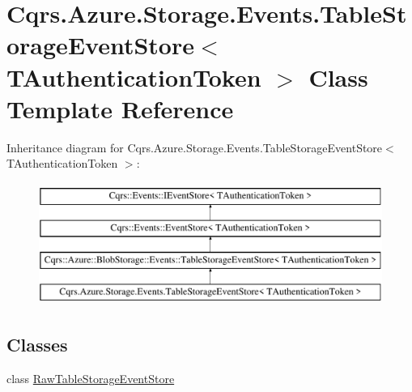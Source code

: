 \hypertarget{classCqrs_1_1Azure_1_1Storage_1_1Events_1_1TableStorageEventStore}{}\section{Cqrs.\+Azure.\+Storage.\+Events.\+Table\+Storage\+Event\+Store$<$ T\+Authentication\+Token $>$ Class Template Reference}
\label{classCqrs_1_1Azure_1_1Storage_1_1Events_1_1TableStorageEventStore}
Inheritance diagram for Cqrs.\+Azure.\+Storage.\+Events.\+Table\+Storage\+Event\+Store$<$ T\+Authentication\+Token $>$\+:\begin{figure}[H]
\begin{center}
\leavevmode
\includegraphics[height=4.000000cm]{classCqrs_1_1Azure_1_1Storage_1_1Events_1_1TableStorageEventStore}
\end{center}
\end{figure}
\subsection*{Classes}
\begin{DoxyCompactItemize}
\item 
class \hyperlink{classCqrs_1_1Azure_1_1Storage_1_1Events_1_1TableStorageEventStore_1_1RawTableStorageEventStore}{Raw\+Table\+Storage\+Event\+Store}
\end{DoxyCompactItemize}
